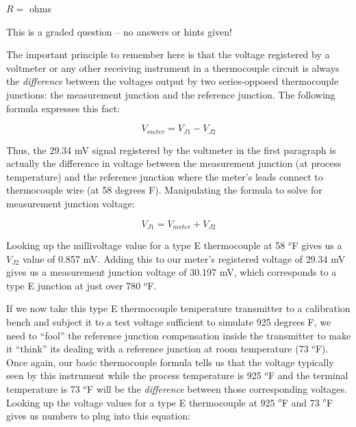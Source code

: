 $R = $ \underbar{\hskip 50pt} ohms



\vfil
{}
\eject






This is a graded question -- no answers or hints given!







The important principle to remember here is that the voltage registered by a voltmeter or any other receiving instrument in a thermocouple circuit is always the {\it difference} between the voltages output by two series-opposed thermocouple junctions: the measurement junction and the reference junction.  The following formula expresses this fact:

$$V_{meter} = V_{J1} - V_{J2}$$

Thus, the 29.34 mV signal registered by the voltmeter in the first paragraph is actually the difference in voltage between the measurement junction (at process temperature) and the reference junction where the meter's leads connect to thermocouple wire (at 58 degrees F).  Manipulating the formula to solve for measurement junction voltage:

$$V_{J1} = V_{meter} + V_{J2}$$

Looking up the millivoltage value for a type E thermocouple at 58 $^{o}$F gives us a $V_{J2}$ value of 0.857 mV.  Adding this to our meter's registered voltage of 29.34 mV gives us a measurement junction voltage of 30.197 mV, which corresponds to a type E junction at just over 780 $^{o}$F.

\vskip 50pt

If we now take this type E thermocouple temperature transmitter to a calibration bench and subject it to a test voltage sufficient to simulate 925 degrees F, we need to ``fool'' the reference junction compensation inside the transmitter to make it ``think'' its dealing with a reference junction at room temperature (73 $^{o}$F).  Once again, our basic thermocouple formula tells us that the voltage typically seen by this instrument while the process temperature is 925 $^{o}$F and the terminal temperature is 73 $^{o}$F will be the {\it difference} between those corresponding voltages.  Looking up the voltage values for a type E thermocouple at 925 $^{o}$F and 73 $^{o}$F gives us numbers to plug into this equation:

